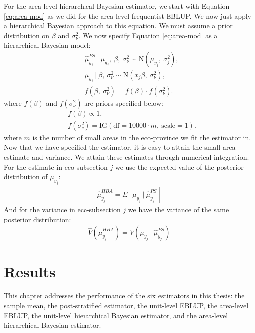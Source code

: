 \documentclass[12pt,twoside]{reedthesis}
\begin{document}
For the area-level hierarchical Bayesian estimator, we start with Equation \eqref{eq:area-mod} as we did for the area-level frequentist EBLUP. We now just apply a hierarchical Bayesian approach to this equation. We must assume a prior distribution on \(\beta\) and \(\sigma^2_\nu\). We now specify Equation \eqref{eq:area-mod} as a hierarchical Bayesian model:
\begin{align}
&\hat\mu_{y_j}^{PS} ~\vert~ \mu_{y_j},~ \beta,~ \sigma^2_\nu \sim \text{N}(\mu_{y_j},~ \sigma^2_j), \nonumber \\
&\mu_{y_j} ~\vert~ \beta,~ \sigma^2_\nu \sim \text{N}(x_j\beta,~ \sigma^2_\nu),\nonumber \\
&f(\beta,~ \sigma^2_\nu) = f(\beta)\cdot f(\sigma^2_\nu).
\end{align}
where \(f(\beta)\) and \(f(\sigma^2_\nu)\) are priors specified below:
\begin{align*}
&f(\beta) \propto 1, \\
&f(\sigma^2_\nu) = \text{IG}(\text{df} = 10000 \cdot m,~ \text{scale} = 1).
\end{align*}
where \(m\) is the number of small areas in the eco-province we fit the estimator in. Now that we have specified the estimator, it is easy to attain the small area estimate and variance. We attain these estimates through numerical integration. For the estimate in eco-subsection \(j\) we use the expected value of the posterior distribution of \(\mu_{y_j}\):
\begin{align}
\hat\mu_{y_j}^{HBA} = E[\mu_{y_j} ~\vert~ \hat\mu_{y_j}^{PS}] 
\end{align}
And for the variance in eco-subsection \(j\) we have the variance of the same posterior distribution:
\begin{align}
\hat V(\hat\mu_{y_j}^{HBA}) = V(\mu_{y_j} ~\vert~ \hat\mu_{y_j}^{PS})
\end{align}
\hypertarget{results}{%
\chapter{Results}\label{results}}

This chapter addresses the performance of the six estimators in this thesis: the sample mean, the post-stratified estimator, the unit-level EBLUP, the area-level EBLUP, the unit-level hierarchical Bayesian estimator, and the area-level hierarchical Bayesian estimator.
\end{document}
